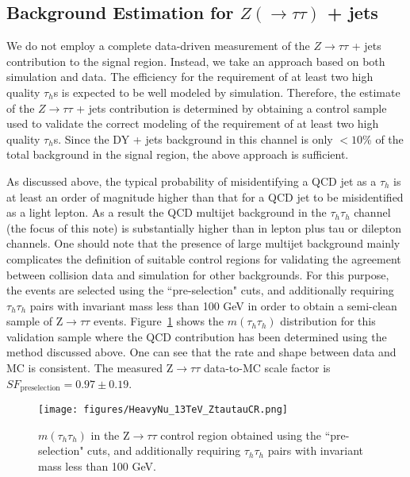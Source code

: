 \subsection{\texorpdfstring{Background Estimation for $Z (\rightarrow \tau\tau)$ + jets}{Background Estimation for Z (to tau tau) + jets}}

We do not employ a complete data-driven measurement of the $Z\to\tau\tau$ + jets contribution to the signal region. Instead, we take an approach based on
both simulation and data. The efficiency for the requirement of at least two high quality $\tau_{h}$s is expected to be well modeled by simulation. 
Therefore, the estimate of the $Z\to\tau\tau$ + jets contribution is determined by obtaining a control sample used to validate the 
correct modeling of the requirement of at least two high quality $\tau_{h}$s. 
Since the DY + jets background in this channel is only 
$< 10$\% of the total background in the signal region, the above approach is sufficient. 

As discussed above, the typical probability of misidentifying a QCD jet as a $\tau_{h}$ is at least
an order of magnitude higher than that for a QCD jet to be misidentified as a light lepton. As a
result the QCD multijet background in the $\tau_{h}\tau_{h}$ channel (the focus of this note) is substantially higher
than in lepton plus tau or dilepton channels. One should note that the presence
of large multijet background mainly complicates the definition of suitable control regions for
validating the agreement between collision data and simulation for other backgrounds.
For this purpose, the events are selected using the ``pre-selection" cuts, and additionally requiring $\tau_{h}\tau_{h}$ pairs with
invariant mass less than 100 GeV in order to obtain a semi-clean sample of Z$\to\tau\tau$ events. 
Figure~\ref{fig:ZtautauControlDiHad} shows the $m(\tau_{h}\tau_{h})$ distribution for this validation sample where the QCD contribution has been determined using
the method discussed above. One can see that the rate and shape between data and MC is consistent. The measured Z$\to\tau\tau$ data-to-MC scale factor is {\bf 
$SF_{\textrm{preselection}} = 0.97 \pm 0.19$}.

\begin{figure}[tbh!]
  \centering
    \texttt{[image: figures/HeavyNu\_13TeV\_ZtautauCR.png]}
  \caption{ $m(\tau_{h}\tau_{h})$ in the Z$\to\tau\tau$ control region obtained using the ``pre-selection" cuts, and additionally requiring 
$\tau_{h}\tau_{h}$ pairs with invariant mass less than 100 GeV.}
  \label{fig:ZtautauControlDiHad}
\end{figure}
